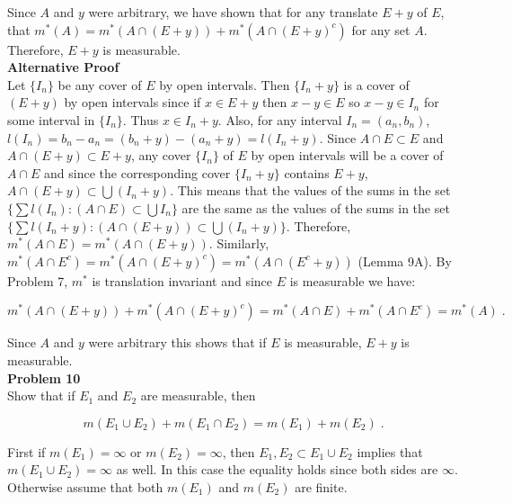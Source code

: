 \documentclass[a4paper]{article}
\begin{document}
Since $A$ and $y$ were arbitrary, we have shown that for any translate $E+y$ of $E$, that $m^*(A) = m^*(A \cap (E+y)) + m^*(A \cap (E+y)^c)$ for any set $A$. Therefore, $E+y$ is measurable.\\

{\bf Alternative Proof}\\
Let $\{I_n\}$ be any cover of $E$ by open intervals. Then $\{I_n + y\}$ is a cover of $(E + y)$ by open intervals since if $x \in E+y$ then $x - y \in E$ so $x-y \in I_n$ for some interval in $\{I_n\}$. Thus $x \in I_n + y$. Also, for any interval $I_n = (a_n,b_n)$, $l(I_n) = b_n - a_n = (b_n +y ) - (a_n+y) = l(I_n + y)$. Since $A\cap E \subset E$ and $A\cap (E+y) \subset E+y$, any cover $\{I_n\}$ of $E$ by open intervals will be a cover of $A\cap E$ and since the corresponding cover $\{I_n + y\}$ contains $E+y$, $A\cap (E+y) \subset \bigcup (I_n+y)$. This means that the values of the sums in the set $\{\sum l(I_n) : (A\cap E) \subset \bigcup I_n\}$ are the same as the values of the sums in the set $\{\sum l(I_n + y) : (A\cap (E+y)) \subset \bigcup (I_n + y)\}$. Therefore, $m^*(A \cap E) = m^*(A\cap (E+y))$. Similarly, $m^*(A\cap E^c) = m^*(A \cap (E+y)^c) = m^*(A \cap (E^c + y))$ (Lemma 9A). By Problem 7, $m^*$ is translation invariant and since $E$ is measurable we have:

$$m^*(A\cap (E+y)) + m^*(A \cap (E+y)^c) = m^*(A\cap E) + m^*(A \cap E^c) = m^*(A) \;.$$

Since $A$ and $y$ were arbitrary this shows that if $E$ is measurable, $E+y$ is measurable. \\


{\bf Problem 10}\\

Show that if $E_1$ and $E_2$ are measurable, then 

$$m(E_1\cup E_2) + m(E_1\cap E_2) = m(E_1) + m(E_2) \;.$$

First if $m(E_1) = \infty$ or $m(E_2) = \infty$, then $E_1,E_2 \subset E_1\cup E_2$ implies that $m(E_1\cup E_2) = \infty$ as well. In this case the equality holds since both sides are $\infty$. Otherwise assume that both $m(E_1)$ and $m(E_2)$ are finite.\\
\end{document}
